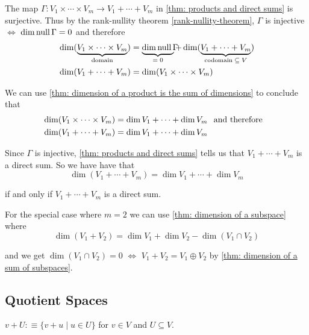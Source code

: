 \begin{prf}
  The map $\Gamma: V_1 \times \cdots \times V_m \to V_1 + \cdots + V_m$ in \ref{thm: products and direct sums} is surjective. Thus by the rank-nullity theorem \ref{rank-nullity-theorem}, $\Gamma$ is injective $\iff$ $\dim \operatorname{null} \Gamma = 0$ and therefore
  \[
  \begin{aligned}
    &\dim (\underbrace{V_1 \times \cdots \times V_m}_{\text{domain}})=\underbrace{\dim \mynull \Gamma \phantom{V_m} \! \! \! \! \! \! \! \! \! \! \!}_{= \; 0} +  \dim(\underbrace{V_1 + \cdots + V_m}_{\text{codomain} \; \subseteq \; V
    }) \\
    &\dim (V_1 + \cdots + V_m) = \dim (V_1 \times \cdots \times V_m)
  \end{aligned}
  \]

  We can use \ref{thm: dimension of a product is the sum of dimensions} to conclude that
  \begin{equation}
    \begin{aligned}
      &\dim (V_1 \times \cdots \times V_m) = \dim V_1 + \cdots + \dim V_m \;\;\, \text{and therefore }\;\; \\
      &\dim (V_1 + \cdots + V_m) =  \dim V_1 + \cdots + \dim V_m
    \end{aligned}
  \end{equation}


  Since $\Gamma$ is injective, \ref{thm: products and direct sums} tells us that $V_1+\cdots+V_m$ is a direct sum.
  So we have have that
  \[\dim (V_1 + \cdots + V_m) =  \dim V_1 + \cdots + \dim V_m
  \]

  if and only if $V_1+\cdots+V_m$ is a direct sum.

   For the special case where $m=2$ we can use \ref{thm: dimension of a subspace} where
  \[
    \dim (V_1 + V_2) = \dim V_1 + \dim V_2 - \dim (V_1 \cap V_2)
  \]

  and we get $\dim (V_1 \cap V_2) = 0$ $\iff$ $V_1 + V_2 = V_1 \oplus V_2$ by \ref{thm: dimension of a sum of subspaces}.
\end{prf}

\subsection{Quotient Spaces}

\setcounter{thm}{94}
\begin{mydef} [notation $v+U$]
  $v+U :\equiv \{v+u \mid u\in U\}$ for $v\in V$ and $U\subseteq V$.
\end{mydef}

